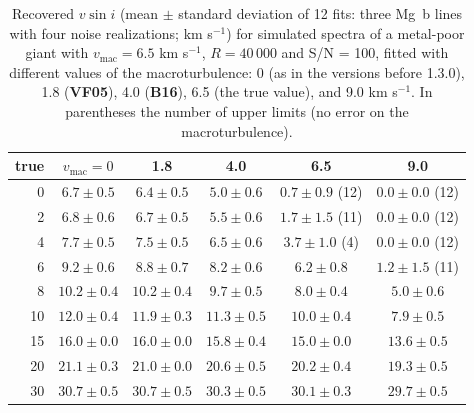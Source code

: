\documentclass[modern]{aastex701}
\begin{document}
\begin{table}[h]
    \centering
    \caption{Recovered $v \sin i$ (mean $\pm$ standard deviation of 12 fits: three Mg~b lines with four noise realizations; km s$^{-1}$) for simulated spectra of a metal-poor giant with $v_{\mathrm{mac}} = 6.5$ km s$^{-1}$, $R = 40\,000$ and S/N = 100, fitted with different values of the macroturbulence: 0 (as in the versions before 1.3.0), 1.8 ({\bf VF05}), 4.0 ({\bf B16}), 6.5 (the true value), and 9.0 km s$^{-1}$. In parentheses the number of upper limits (no error on the macroturbulence).}
    \label{tab:rot_sims_giant}
    \small
    \begin{tabular}{rccccc}
        \hline
        true & $v_{\mathrm{mac}} = 0$ & 1.8 & 4.0 & 6.5 & 9.0 \\
        \hline
         0 & $6.7 \pm 0.5$ & $6.4 \pm 0.5$ & $5.0 \pm 0.6$ & $0.7 \pm 0.9$ (12) & $0.0 \pm 0.0$ (12) \\
         2 & $6.8 \pm 0.6$ & $6.7 \pm 0.5$ & $5.5 \pm 0.6$ & $1.7 \pm 1.5$ (11) & $0.0 \pm 0.0$ (12) \\
         4 & $7.7 \pm 0.5$ & $7.5 \pm 0.5$ & $6.5 \pm 0.6$ & $3.7 \pm 1.0$ (4) & $0.0 \pm 0.0$ (12) \\
         6 & $9.2 \pm 0.6$ & $8.8 \pm 0.7$ & $8.2 \pm 0.6$ & $6.2 \pm 0.8$ & $1.2 \pm 1.5$ (11) \\
         8 & $10.2 \pm 0.4$ & $10.2 \pm 0.4$ & $9.7 \pm 0.5$ & $8.0 \pm 0.4$ & $5.0 \pm 0.6$ \\
        10 & $12.0 \pm 0.4$ & $11.9 \pm 0.3$ & $11.3 \pm 0.5$ & $10.0 \pm 0.4$ & $7.9 \pm 0.5$ \\
        15 & $16.0 \pm 0.0$ & $16.0 \pm 0.0$ & $15.8 \pm 0.4$ & $15.0 \pm 0.0$ & $13.6 \pm 0.5$ \\
        20 & $21.1 \pm 0.3$ & $21.0 \pm 0.0$ & $20.6 \pm 0.5$ & $20.2 \pm 0.4$ & $19.3 \pm 0.5$ \\
        30 & $30.7 \pm 0.5$ & $30.7 \pm 0.5$ & $30.3 \pm 0.5$ & $30.1 \pm 0.3$ & $29.7 \pm 0.5$ \\
        \hline
    \end{tabular}
\end{table}
\end{document}
